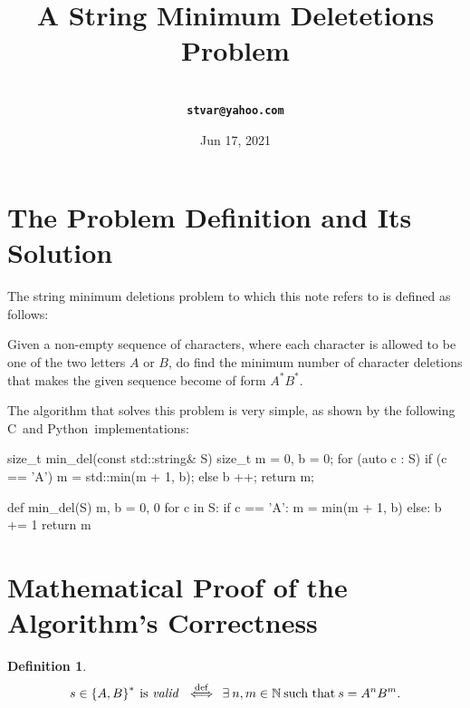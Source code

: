 \documentclass[a4paper,9pt,leqno]{article}
\title{A String Minimum Deletetions Problem}
\author{\larger\vargyas\medskip\\ \tt\textbf{stvar@yahoo.com}}
\date{Jun 17, 2021}
\renewcommand{\=}{\protect\nobreakdash-\hspace{0pt}}
\renewcommand{\~}{\protect\nobreakdash--\hspace{0pt}}
\newcommand{\plusplus}{\textbf{\raisebox{1pt}{++}}}
\newcommand{\cplusplus}{C\plusplus}
\newcommand{\python}{Python}
\theoremstyle{plain}
\theoremstyle{definition}
\newtheorem{definition}[fact]{Definition}
\theoremstyle{remark}
\newcommand{\iffl}{\:\:\Longleftrightarrow\:\:}
\newcommand{\by}[1]{{#1}}
\newcommand{\bydef}{\by{def}}
\newcommand{\symby}[2]{\stackrel{#1}{{#2}}}
\newcommand{\symbyrm}[2]{\symby{{\rm\scriptstyle{#1}}}{#2}}
\newcommand{\iffby}[1]{\symbyrm{#1}{\iffl}}
\newcommand{\iffbydef}{\iffby{\bydef}}
\newcommand{\txt}[1]{\:\text{#1}\:}
\newcommand{\ms}{\:}
\newcommand{\lc}{\left\{}
\newcommand{\rc}{\right\}}
\newcommand\Nat{\mathbb{N}}
\newcommand\Nat*{\mathbb{N}^*}
\begin{document}
\maketitle
\tableofcontents

\section{The Problem Definition and Its Solution}

The string minimum deletions problem to which this note refers
to is defined as follows:

\begin{quoting}
Given a non-empty sequence of characters, where each character
is allowed to be one of the two letters $A$ or $B$, do find the
minimum number of character deletions that makes the given
sequence become of form $A^\ast\! B^\ast$.
\end{quoting}

The algorithm that solves this problem is very simple, as shown
by the following \cplusplus\ and \python\ implementations:

\medskip

\begin{cpplisting}
size_t min_del(const std::string& S)
{
    size_t m = 0, b = 0;
    for (auto c : S) {
        if (c == 'A')
            m = std::min(m + 1, b);
        else
            b ++;
    }
    return m;
}
\end{cpplisting}

\begin{pylisting}
def min_del(S)
    m, b = 0, 0
    for c in S:
        if c == 'A':
            m = min(m + 1, b)
        else:
            b += 1
    return m
\end{pylisting}

\break

\section{Mathematical Proof of the Algorithm's Correctness}

\begin{definition}
\begin{equation}
s\in\lc A, B\rc^\ast \txt{is {\it valid}} \iffbydef
\exists\ms n, m\in\Nat \txt{such that} s = A^n B^m. \label{defvalid}
\end{equation}
\end{definition}
\end{document}

